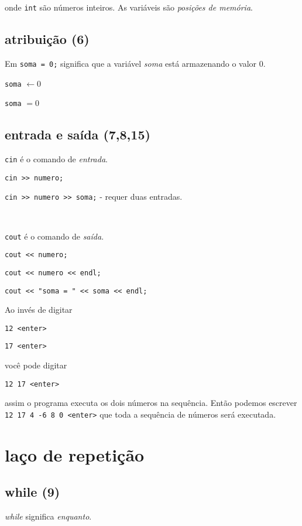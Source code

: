 \documentclass[a4paper]{memoir}
\begin{document}
\noindent onde \verb|int| são números inteiros. As variáveis são \emph{posições de memória}.

\subsection*{atribuição (6)}

Em \verb|soma = 0;| significa que a variável \emph{soma} está armazenando o valor $0$.

\texttt{soma} $\leftarrow 0$

\texttt{soma} $= 0$

\newpage

\subsection*{entrada e saída (7,8,15)}

\verb|cin| é o comando de \emph{entrada}.

\verb|cin >> numero;|

\verb|cin >> numero >> soma;| - requer duas entradas.

\

\verb|cout| é o comando de \emph{saída}.

\verb|cout << numero;|

\verb|cout << numero << endl;|

\verb|cout << "soma = " << soma << endl;|

\begin{ex}[Dica]
Ao invés de digitar

\verb|12 <enter>|

\verb|17 <enter>|

você pode digitar

\verb|12 17 <enter>|

assim o programa executa os dois números na sequência. Então podemos escrever \verb|12 17 4 -6 8 0 <enter>| que toda a sequência de números será executada.
\end{ex}

\section{laço de repetição}

\subsection{while (9)}

\emph{while} significa \emph{enquanto}.
\end{document}
